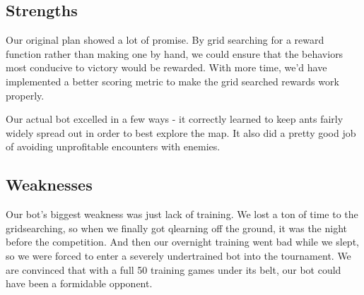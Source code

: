 \documentclass{article}
\begin{document}
\subsection*{Strengths}
Our original plan showed a lot of promise. By grid searching for a reward function rather than making one by hand,
we could ensure that the behaviors most conducive to victory would be rewarded. With more time, we'd have implemented
a better scoring metric to make the grid searched rewards work properly.

Our actual bot excelled in a few ways - it correctly learned to keep ants fairly widely spread out in order to best explore the map.
It also did a pretty good job of avoiding unprofitable encounters with enemies.
\subsection*{Weaknesses}
Our bot's biggest weakness was just lack of training. We lost a ton of time to the gridsearching, so when we finally got qlearning
off the ground, it was the night before the competition. And then our overnight training went bad while we slept, so we were forced
to enter a severely undertrained bot into the tournament. We are convinced that with a full 50 training games under its belt, our bot could
have been a formidable opponent.
\end{document}
